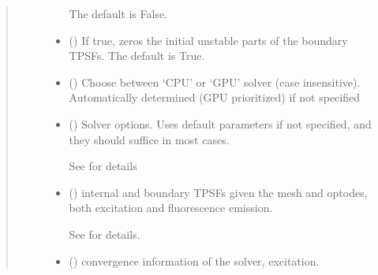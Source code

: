 \documentclass[letterpaper,10pt,english]{sphinxmanual}
\begin{document}
\begin{fulllineitems}
\begin{fulllineitems}
\begin{quote}
\begin{description}
\begin{itemize}
\sphinxAtStartPar
The default is False.


\item {} 
\sphinxAtStartPar
{} (\sphinxstyleliteralemphasis{\sphinxupquote{, }}) \textendash{} If true, zeros the initial unstable parts of the boundary TPSFs. The default is True.

\item {} 
\sphinxAtStartPar
{} (\sphinxstyleliteralemphasis{\sphinxupquote{, }}) \textendash{} Choose between ‘CPU’ or ‘GPU’ solver (case insensitive). Automatically determined (GPU prioritized) if not specified

\item {} 
\sphinxAtStartPar
{} ({\hyperref[\detokenize{_autosummary/nirfasterff.utils.SolverOptions:nirfasterff.utils.SolverOptions}]{}}\sphinxstyleliteralemphasis{\sphinxupquote{, }}) \textendash{} 
\sphinxAtStartPar
Solver options. Uses default parameters if not specified, and they should suffice in most cases.

\sphinxAtStartPar
See {\hyperref[\detokenize{_autosummary/nirfasterff.utils.SolverOptions:nirfasterff.utils.SolverOptions}]{}} for details


\end{itemize}

\sphinxAtStartPar
\begin{itemize}
\item {} 
\sphinxAtStartPar
{} () \textendash{} internal and boundary TPSFs given the mesh and optodes, both excitation and fluorescence emission.

\sphinxAtStartPar
See {\hyperref[\detokenize{_autosummary/nirfasterff.base.data.flTPSFdata:nirfasterff.base.data.flTPSFdata}]{}} for details.

\item {} 
\sphinxAtStartPar
{} () \textendash{} convergence information of the solver, excitation.


\end{itemize}
\end{description}
\end{quote}
\end{fulllineitems}
\end{fulllineitems}
\end{document}
